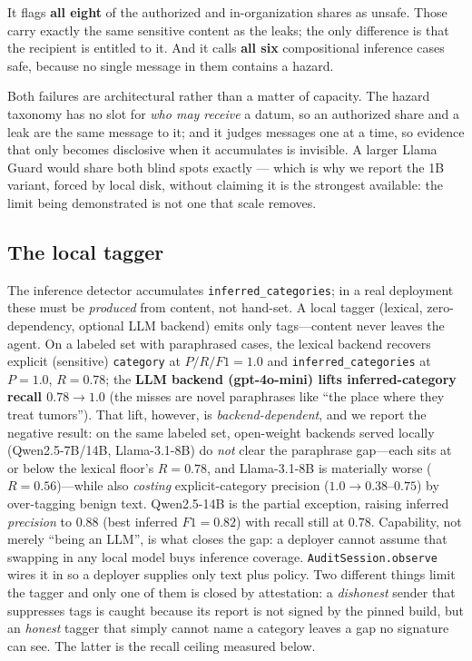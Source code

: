 \documentclass{article}
\begin{document}
It flags \textbf{all eight} of the authorized and in-organization shares as unsafe.
Those carry exactly the same sensitive content as the leaks; the only difference is
that the recipient is entitled to it. And it calls \textbf{all six} compositional
inference cases safe, because no single message in them contains a hazard.

Both failures are architectural rather than a matter of capacity. The hazard
taxonomy has no slot for \emph{who may receive} a datum, so an authorized share and
a leak are the same message to it; and it judges messages one at a time, so
evidence that only becomes disclosive when it accumulates is invisible. A larger
Llama Guard would share both blind spots exactly --- which is why we report the 1B
variant, forced by local disk, without claiming it is the strongest available: the
limit being demonstrated is not one that scale removes.

\subsection{The local tagger}
The inference
detector accumulates \texttt{inferred\_categories}; in a real deployment these
must be \emph{produced} from content, not hand-set. A local tagger (lexical,
zero-dependency, optional LLM backend) emits only tags---content never leaves the
agent. On a labeled set with paraphrased cases, the lexical backend recovers explicit
(sensitive) \texttt{category} at $P/R/F1=1.0$ and \texttt{inferred\_categories}
at $P=1.0$, $R=0.78$; the \textbf{LLM backend (gpt-4o-mini) lifts inferred-category
recall $0.78\to1.0$} (the misses are novel paraphrases like ``the place where they
treat tumors'').
That lift, however, is \emph{backend-dependent}, and we report the negative result:
on the same labeled set, open-weight backends served locally (Qwen2.5-7B/14B,
Llama-3.1-8B) do \emph{not} clear the paraphrase gap---each sits at or below the
lexical floor's $R{=}0.78$, and Llama-3.1-8B is materially worse ($R{=}0.56$)---while
also \emph{costing} explicit-category precision ($1.0\to0.38$--$0.75$) by over-tagging
benign text. Qwen2.5-14B is the partial exception, raising inferred \emph{precision}
to $0.88$ (best inferred $F1{=}0.82$) with recall still at $0.78$. Capability, not
merely ``being an LLM'', is what closes the gap: a deployer cannot assume that
swapping in any local model buys inference coverage.
\texttt{AuditSession.observe} wires it in so a deployer supplies only text plus
policy. Two different things limit the tagger and only one of them is closed by
attestation: a \emph{dishonest} sender that suppresses tags is caught because its
report is not signed by the pinned build, but an \emph{honest} tagger that simply
cannot name a category leaves a gap no signature can see. The latter is the recall
ceiling measured below.
\end{document}
